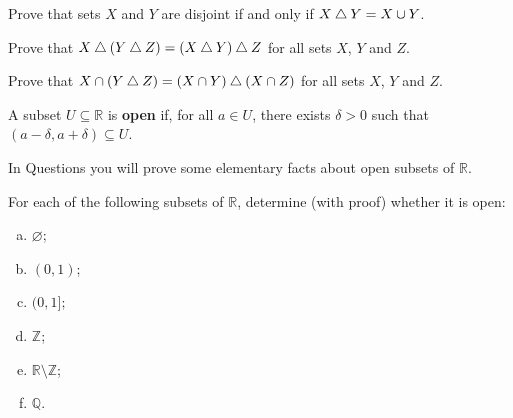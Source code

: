 \begin{chapex}
Prove that sets $X$ and $Y$ are disjoint if and only if $X \mathbin{\triangle} Y = X \cup Y$.
\end{chapex}

\begin{chapex}
Prove that $X \mathbin{\triangle} (Y \mathbin{\triangle} Z) = (X \mathbin{\triangle} Y) \mathbin{\triangle} Z$ for all sets $X$, $Y$ and $Z$.
\end{chapex}

\begin{chapex}
\label{cqSymmetricDifferenceEnd}
Prove that $X \cap (Y \mathbin{\triangle} Z) = (X \cap Y) \mathbin{\triangle} (X \cap Z)$ for all sets $X$, $Y$ and $Z$.
\end{chapex}

\begin{definition}
\label{defOpenSubsetOfR}
A subset $U \subseteq \mathbb{R}$ is \textbf{open} if, for all $a \in U$, there exists $\delta > 0$ such that $(a-\delta, a+\delta) \subseteq U$.
\end{definition}

In Questions  you will prove some elementary facts about open subsets of $\mathbb{R}$.

\begin{chapex}
\label{cqOpenSubsetsOfRBegin}
For each of the following subsets of $\mathbb{R}$, determine (with proof) whether it is open:
\begin{multicols}{3}
\begin{enumerate}[(a)]
\item $\varnothing$;
\item $(0,1)$;
\item $(0,1]$;
\item $\mathbb{Z}$;
\item $\mathbb{R} \setminus \mathbb{Z}$;
\item $\mathbb{Q}$.
\end{enumerate}
\end{multicols}
\end{chapex}

